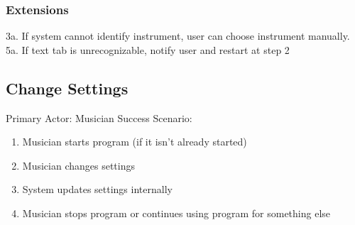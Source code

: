\documentclass[11pt]{article}
\begin{document}
\subsubsection{Extensions}
\label{sec:orgfc6bcf2}
3a. If system cannot identify instrument, user can choose instrument manually.
5a. If text tab is unrecognizable, notify user and restart at step 2

\subsection{Change Settings}
\label{sec:org99b4cab}
Primary Actor: Musician
Success Scenario:
\begin{enumerate}
\item Musician starts program (if it isn't already started)
\item Musician changes settings
\item System updates settings internally
\item Musician stops program or continues using program for something else
\end{enumerate}
\end{document}
